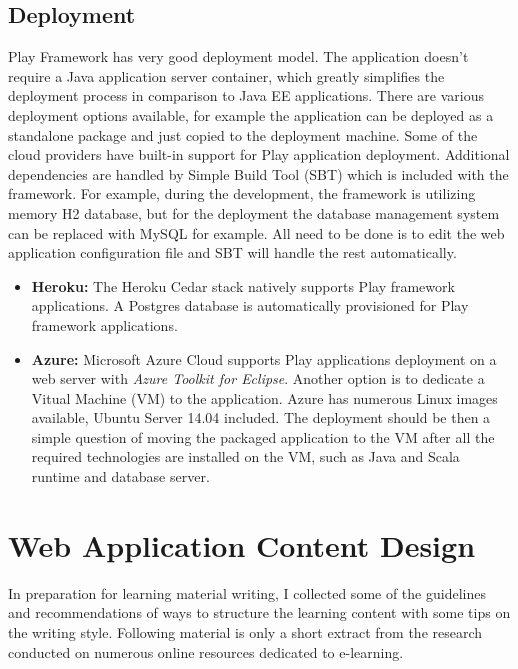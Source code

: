 \documentclass[12pt,twoside,a4paper]{report}
\begin{document}
\subsection{Deployment}\label{3.3.3}
Play Framework has very good deployment model. The application doesn't require a Java application server container, which greatly simplifies the deployment process in comparison to Java EE applications. There are various deployment options available, for example the application can be deployed as a standalone package and just copied to the deployment machine. Some of the cloud providers have built-in support for Play application deployment. Additional dependencies are handled by Simple Build Tool (SBT)\cite{29} which is included with the framework. For example,	 during the development, the framework is utilizing memory H2 database, but for the deployment the database management system can be replaced with MySQL for example. All need to be done is to edit the web application configuration file and SBT will handle the rest automatically.
\begin{itemize}\itemsep1pt \parskip0pt 
\item \textbf{Heroku:} The Heroku Cedar stack natively supports Play framework applications. A Postgres database is automatically provisioned for Play framework applications.\cite{26}
\item \textbf{Azure:} Microsoft Azure Cloud supports Play applications deployment on a web server with \emph{Azure Toolkit for Eclipse}. Another option is to dedicate a Vitual Machine (VM) to the application. Azure has numerous Linux images available, Ubuntu Server 14.04 included. The deployment should be then a simple question of moving the packaged application to the VM after all the required technologies are installed on the VM, such as Java and Scala runtime and database server.\cite{27}
\end{itemize}

\section{Web Application Content Design}\label{3.4}
In preparation for learning material writing, I collected some of the guidelines and recommendations of ways to structure the learning content with some tips on the writing style. Following material is only a short extract from the research conducted on numerous online resources dedicated to e-learning.
\end{document}
